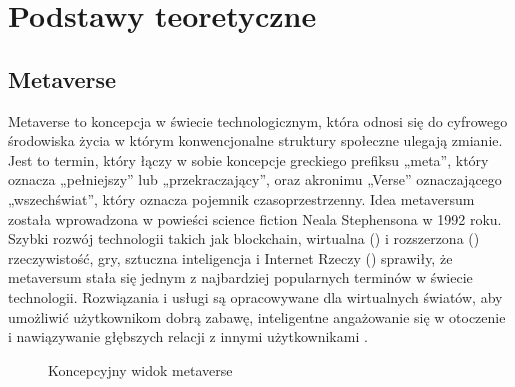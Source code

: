
\chapter{Podstawy teoretyczne}
\section{Metaverse}


Metaverse to koncepcja w świecie technologicznym, która odnosi się do cyfrowego środowiska życia w którym konwencjonalne struktury społeczne ulegają zmianie. Jest to termin, który łączy w sobie koncepcje greckiego prefiksu „meta”, który oznacza „pełniejszy” lub „przekraczający”, oraz akronimu „Verse” oznaczającego „wszechświat”, który oznacza pojemnik czasoprzestrzenny. Idea metaversum została wprowadzona w powieści science fiction Neala Stephensona  w 1992 roku. Szybki rozwój technologii takich jak blockchain, wirtualna () i rozszerzona () rzeczywistość, gry, sztuczna inteligencja i Internet Rzeczy  () sprawiły, że metaversum stała się jednym z najbardziej popularnych terminów w świecie technologii. Rozwiązania i usługi są opracowywane dla wirtualnych światów, aby umożliwić użytkownikom dobrą zabawę, inteligentne angażowanie się w otoczenie i nawiązywanie głębszych relacji z innymi użytkownikami \cite{metaverseAsAService}. 

\begin{figure}[htbp!]
    \centering
    
    \caption{Koncepcyjny widok metaverse\cite{metaverseUseCaseslee}}
    \label{fig:enter-label}
\end{figure}

